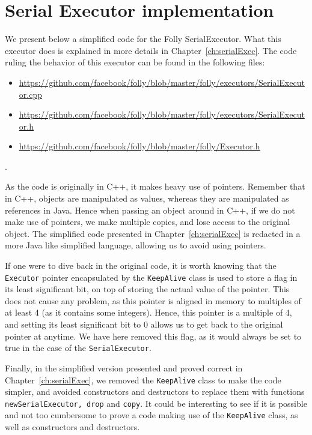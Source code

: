\chapter{Serial Executor implementation}
\label{app:serialExec}
We present below a simplified code for the Folly SerialExecutor. What this executor does is explained in more details in Chapter~\ref{ch:serialExec}. The code ruling the behavior of this executor can be found in the following files:
\begin{itemize}
	\item \url{https://github.com/facebook/folly/blob/master/folly/executors/SerialExecutor.cpp}
	\item \url{https://github.com/facebook/folly/blob/master/folly/executors/SerialExecutor.h}
	\item \url{https://github.com/facebook/folly/blob/master/folly/Executor.h}
\end{itemize}. 

As the code is originally in C++, it makes heavy use of pointers. Remember that in C++, objects are manipulated as values, whereas they are manipulated as references in Java. Hence when passing an object around in C++, if we do not make use of pointers, we make multiple copies, and lose access to the original object. The simplified code presented in Chapter~\ref{ch:serialExec} is redacted in a more Java like simplified language, allowing us to avoid using pointers.

If one were to dive back in the original code, it is worth knowing that the \texttt{Executor} pointer encapsulated by the \texttt{KeepAlive} class is used to store a flag in its least significant bit, on top of storing the actual value of the pointer. This does not cause any problem, as this pointer is aligned in memory to multiples of at least 4 (as it contains some integers). Hence, this pointer is a multiple of 4, and setting its least significant bit to 0 allows us to get back to the original pointer at anytime. We have here removed this flag, as it would always be set to true in the case of the \texttt{SerialExecutor}.

Finally, in the simplified version presented and proved correct in Chapter~\ref{ch:serialExec}, we removed the \texttt{KeepAlive} class to make the code simpler, and avoided constructors and destructors to replace them with functions \texttt{newSerialExecutor, drop} and \texttt{copy}. It could be interesting to see if it is possible and not too cumbersome to prove a code making use of the \texttt{KeepAlive} class, as well as constructors and destructors.

